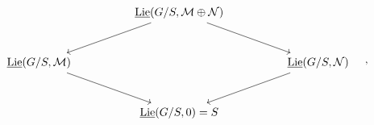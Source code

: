 \[\begin{tikzcd}[column sep=huge,row sep=large]
& \underline{\operatorname{Lie}}(G/S,\mathcal M\oplus\mathcal N) \arrow[dl] \arrow[dr] &\\
\underline{\operatorname{Lie}}(G/S,\mathcal M) \arrow[dr] && \underline{\operatorname{Lie}}(G/S,\mathcal N) \arrow[dl]\\
& \underline{\operatorname{Lie}}(G/S,0)=S &
\end{tikzcd}\quad ,\]

